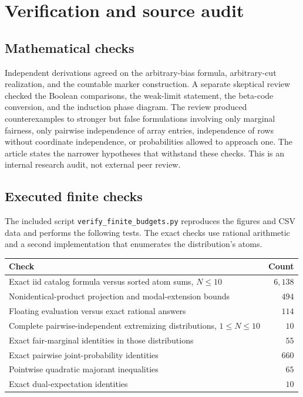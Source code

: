 \documentclass[11pt]{article}
\numberwithin{equation}{section}
\theoremstyle{definition}
\theoremstyle{remark}
\begin{document}
\section{Verification and source audit}
\label{rbc:sec:audit}

\subsection{Mathematical checks}

Independent derivations agreed on the arbitrary-bias formula, arbitrary-cut
realization, and the countable marker construction. A separate skeptical
review checked the Boolean comparisons, the weak-limit statement, the
beta-code conversion, and the induction phase diagram. The review produced
counterexamples to stronger but false formulations involving only marginal
fairness, only pairwise independence of array entries, independence of rows
without coordinate independence, or probabilities allowed to approach one.
The article states the narrower hypotheses that withstand these checks.
This is an internal research audit, not external peer review.

\subsection{Executed finite checks}

The included script \texttt{verify\_finite\_budgets.py} reproduces the
figures and CSV data and performs the following tests. The exact checks use
rational arithmetic and a second implementation that enumerates the
distribution's atoms.

\begin{center}
\begin{tabular}{p{}r}
\toprule
Check & Count\\
\midrule
Exact iid catalog formula versus sorted atom sums, $N\le10$ & $6{,}138$\\
Nonidentical-product projection and modal-extension bounds & $494$\\
Floating evaluation versus exact rational answers & $114$\\
Complete pairwise-independent extremizing distributions, $1\le N\le10$ & $10$\\
Exact fair-marginal identities in those distributions & $55$\\
Exact pairwise joint-probability identities & $660$\\
Pointwise quadratic majorant inequalities & $65$\\
Exact dual-expectation identities & $10$\\
\bottomrule
\end{tabular}
\end{center}
\end{document}

